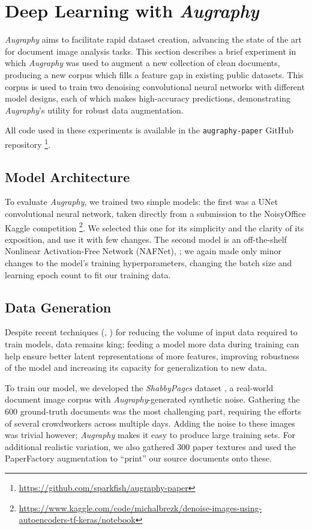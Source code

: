 \documentclass[runningheads]{llncs}
\begin{document}
\section{Deep Learning with \emph{Augraphy}}
\emph{Augraphy} aims to facilitate rapid dataset creation, advancing the state of the art for document image analysis tasks.
This section describes a brief experiment in which \emph{Augraphy} was used to augment a new collection of clean documents, producing a new corpus which fills a feature gap in existing public datasets. This corpus is used to train two denoising convolutional neural networks with different model designs, each of which makes high-accuracy predictions, demonstrating \emph{Augraphy}'s utility for robust data augmentation.

All code used in these experiments is available in the \texttt{augraphy-paper} GitHub repository \footnote{\url{https://github.com/sparkfish/augraphy-paper}}.

\subsection{Model Architecture}
To evaluate \emph{Augraphy}, we trained two simple models: the first was a UNet convolutional neural network, taken directly from a submission to the NoisyOffice Kaggle competition  \footnote{\url{https://www.kaggle.com/code/michalbrezk/denoise-images-using-autoencoders-tf-keras/notebook}}. We selected this one for its simplicity and the clarity of its exposition, and use it with few changes. The second model is an off-the-shelf Nonlinear Activation-Free Network (NAFNet), \cite{ref_nafnet}; we again made only minor changes to the model's training hyperparameters, changing the batch size and learning epoch count to fit our training data.

\subsection{Data Generation}
Despite recent techniques (\cite{ref_tvt2040}, \cite{ref_vtssds}) for reducing the volume of input data required to train models, data remains king; feeding a model more data during training can help ensure better latent representations of more features, improving robustness of the model and increasing its capacity for generalization to new data.

To train our model, we developed the \emph{ShabbyPages} dataset \cite{ref_ShabbyPages}, a real-world document image corpus with \emph{Augraphy}-generated synthetic noise.
Gathering the 600 ground-truth documents was the most challenging part, requiring the efforts of several crowdworkers across multiple days. Adding the noise to these images was trivial however; \emph{Augraphy} makes it easy to produce large training sets.
For additional realistic variation, we also gathered 300 paper textures and used the PaperFactory augmentation to ``print'' our source documents onto these.
\end{document}
